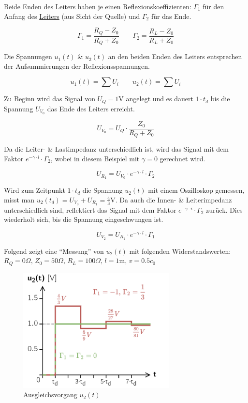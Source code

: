 \documentclass[
  10pt,
  a4paper,
  german]{article}
\numberwithin{equation}{section}
\begin{document}
\begin{multicols}{2}

Beide Enden des Leiters haben je einen Reflexionskoeffizienten:
\(\Gamma_1\) für den Anfang des \ul{Leiters} (aus Sicht der Quelle) und
\(\Gamma_2\) für das Ende.

\[
\Gamma_1 = \frac{R_Q-Z_0}{R_Q+Z_0} \qquad \Gamma_2 = \frac{R_L-Z_0}{R_L+Z_0}
\]

Die Spannungen \(u_1(t)\) \& \(u_2(t)\) an den beiden Enden des Leiters
entsprechen der Aufsummierungen der Reflexionsspannungen.

\[
u_1(t)=\sum U_i \qquad u_2(t)=\sum U_i
\]

Zu Beginn wird das Signal von \(U_Q=1\text{V}\) angelegt und es dauert
\(1\cdot t_d\) bis die Spannung \(U_{V_0}\) das Ende des Leiters
erreicht.

\[
U_{V_0} = U_Q \cdot \frac{Z_0}{R_Q+Z_0}
\]

Da die Leiter- \& Lastimpedanz unterschiedlich ist, wird das Signal mit
dem Faktor \(e^{-\gamma\cdot l}\cdot \Gamma_2\), wobei in diesem
Beispiel mit \(\gamma=0\) gerechnet wird.

\[
U_{R_1}=U_{V_0}\cdot e^{-\gamma\cdot l}\cdot \Gamma_2
\]

Wird zum Zeitpunkt \(1\cdot t_d\) die Spannung \(u_2(t)\) mit einem
Oszilloskop gemessen, misst man
\(u_2(t_d)=U_{V_0}+U_{R_1}=\tfrac{4}{3}\text{V}\). Da auch die Innen- \&
Leiterimpedanz unterschiedlich sind, reflektiert das Signal mit dem
Faktor \(e^{-\gamma\cdot i}\cdot \Gamma_2\) zurück. Dies wiederholt
sich, bis die Spannung eingeschwungen ist.

\[
U_{V_2}=U_{R_1}\cdot e^{-\gamma\cdot l}\cdot \Gamma_1
\]

\end{multicols}

Folgend zeigt eine ``Messung'' von \(u_2(t)\) mit folgenden
Widerstandswerten:
\(R_Q=0\Omega,\, Z_0=50\Omega,\, R_L=100\Omega,\, l=1\text{m},\, v=0.5c_0\)

\begin{figure}[H]

{\centering \includegraphics[width=8cm,height=\textheight]{images/03_ausgleichsvorgang_u2.png}

}

\caption{\label{fig-ausgleichsvorgang}Ausgleichsvorgang \(u_2(t)\)}

\end{figure}
\end{document}
